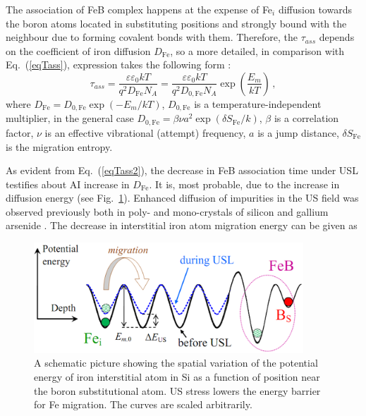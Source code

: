 \documentclass[sn-mathphys]{sn-jnl}%
\theoremstyle{thmstyleone}%
\theoremstyle{thmstyletwo}%
\theoremstyle{thmstylethree}%
\begin{document}
The association of FeB complex happens at the  expense of  Fe$_i$ diffusion towards the
boron atoms located in substituting positions and strongly bound with the neighbour due to forming covalent bonds with them.
Therefore, the $\tau_{ass}$ depends on the coefficient of iron diffusion $D_\mathrm{Fe}$,
so a more detailed, in comparison with Eq.~(\ref{eqTass}), expression takes the following form \cite{FeBAssJAP2014,FeBJAP2005,FeBKin2019}:
\begin{equation}
\label{eqTass2}
\tau_{ass}=\frac{\varepsilon\varepsilon_0 kT}{q^2D_\mathrm{Fe}N_A}=
\frac{\varepsilon\varepsilon_0 kT}{q^2D_\mathrm{0,Fe}N_A}\exp\left(\frac{E_m}{kT}\right)\,,
\end{equation}
where
$D_\mathrm{Fe}=D_\mathrm{0,Fe}\exp(-E_m/kT)$,
$D_\mathrm{0,Fe}$ is a temperature-independent multiplier,
in the general case \cite{AZIZ2001,Stavola,WeberFe}
$D_\mathrm{0,Fe}=\beta\nu a^2\exp(\delta S_\mathrm{Fe}/k)$,
$\beta$ is a correlation factor,
$\nu$  is an effective vibrational (attempt) frequency,
$a$ is a jump distance,
$\delta S_\mathrm{Fe}$ is the migration entropy.

As evident from Eq.~(\ref{eqTass2}), the decrease in FeB association time under USL testifies about
AI increase in $D_\mathrm{Fe}$.
It is, most probable, due to the increase in diffusion energy (see Fig.~\ref{figUSChem}).
Enhanced diffusion of impurities in the US field was observed previously
both in poly- and mono-crystals of silicon and gallium arsenide \cite{Ostapenko1999,Zaveryukhin2002}.
The decrease in interstitial iron atom migration energy can be given as
\begin{figure}
\centering
 \includegraphics[width=0.9\textwidth]{Fig7}
\caption{
A schematic picture showing the spatial variation of the potential energy of
iron interstitial atom in Si as a function of position near the boron substitutional atom.
US stress lowers the energy barrier for Fe migration.
The curves are scaled arbitrarily.
}
\label{figUSChem}       %
\end{figure}
\end{document}
